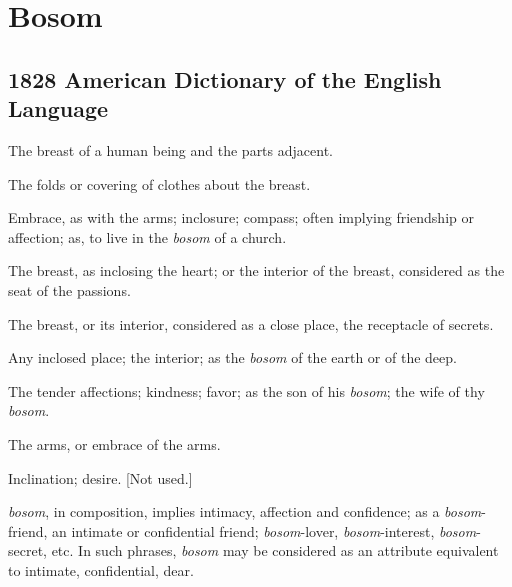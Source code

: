 \section{Bosom}
	\label{BOSOM}
	

\subsection{1828 American Dictionary of the English Language} %
	\label{BOSOM-1828}

	\begin{compactitem}
		\item[1] The breast of a human being and the parts adjacent.
		\item[2] The folds or covering of clothes about the breast.
		\item[3] Embrace, as with the arms; inclosure; compass; often implying friendship or affection; as, to live in the \textit{bosom} of a church.
		\item[4] The breast, as inclosing the heart; or the interior of the breast, considered as the seat of the passions.
		\item[5] The breast, or its interior, considered as a close place, the receptacle of secrets.
		\item[6] Any inclosed place; the interior; as the \textit{bosom} of the earth or of the deep.
		\item[7] The tender affections; kindness; favor; as the son of his \textit{bosom}; the wife of thy \textit{bosom}.
		\item[8] The arms, or embrace of the arms.
		\item[9] Inclination; desire. [Not used.]
		\item \textit{bosom}, in composition, implies intimacy, affection and confidence; as a \textit{bosom}-friend, an intimate or confidential friend; \textit{bosom}-lover, \textit{bosom}-interest, \textit{bosom}-secret, etc. In such phrases, \textit{bosom} may be considered as an attribute equivalent to intimate, confidential, dear.
	\end{compactitem}


